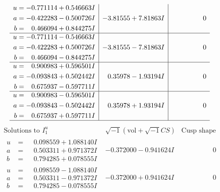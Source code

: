 \documentclass[1p]{elsarticle_modified}
\theoremstyle{definition}
\newcommand{\I}{\sqrt{-1}}
\begin{document}
$$\begin{array}{c|c|c}
\begin{aligned}
u &= -0.771114 + 0.546663 I \\
a &= -0.422283 - 0.500726 I \\
b &= \phantom{-}0.466094 + 0.844275 I\end{aligned}
 & -3.81555 + 7.81863 I & \phantom{-0.000000 } 0 \\ \hline\begin{aligned}
u &= -0.771114 - 0.546663 I \\
a &= -0.422283 + 0.500726 I \\
b &= \phantom{-}0.466094 - 0.844275 I\end{aligned}
 & -3.81555 - 7.81863 I & \phantom{-0.000000 } 0 \\ \hline\begin{aligned}
u &= \phantom{-}0.900983 + 0.596501 I \\
a &= -0.093843 + 0.502442 I \\
b &= \phantom{-}0.675937 - 0.597711 I\end{aligned}
 & \phantom{-}0.35978 - 1.93194 I & \phantom{-0.000000 } 0 \\ \hline\begin{aligned}
u &= \phantom{-}0.900983 - 0.596501 I \\
a &= -0.093843 - 0.502442 I \\
b &= \phantom{-}0.675937 + 0.597711 I\end{aligned}
 & \phantom{-}0.35978 + 1.93194 I & \phantom{-0.000000 } 0\\
 \hline 
 \end{array}$$\newpage$$\begin{array}{c|c|c}  
\text{Solutions to }I^u_{1}& \I (\text{vol} + \sqrt{-1}CS) & \text{Cusp shape}\\
 \hline 
\begin{aligned}
u &= \phantom{-}0.098559 + 1.088140 I \\
a &= \phantom{-}0.503311 + 0.971372 I \\
b &= \phantom{-}0.794285 + 0.078555 I\end{aligned}
 & -0.372000 - 0.941624 I & \phantom{-0.000000 } 0 \\ \hline\begin{aligned}
u &= \phantom{-}0.098559 - 1.088140 I \\
a &= \phantom{-}0.503311 - 0.971372 I \\
b &= \phantom{-}0.794285 - 0.078555 I\end{aligned}
 & -0.372000 + 0.941624 I & \phantom{-0.000000 } 0 \\ \hline\begin{aligned}

\end{aligned}
\end{array}$$
\end{document}
